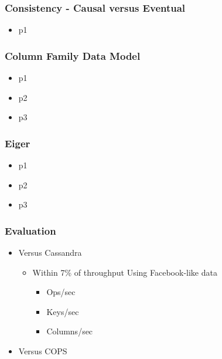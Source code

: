 \documentclass{beamer}
\begin{document}
\begin{frame}
\frametitle{Consistency - Causal versus Eventual}
\begin{itemize}
\pause \item p1	
\end{itemize}  
\end{frame}

\begin{frame}
\frametitle{Column Family Data Model}
\begin{itemize}
\pause \item p1 %
\pause \item p2
\pause \item p3
\end{itemize}  
\end{frame}



\begin{frame}
\frametitle{Eiger}
\begin{itemize}
\pause \item p1 %
\pause \item p2
\pause \item p3
\end{itemize}  
\end{frame}

\begin{frame}
\frametitle{Evaluation}
\begin{itemize}
\pause \item Versus Cassandra
		\begin{itemize}
			\item Within 7\% of throughput Using Facebook-like data
			\begin{itemize}
				\item Ops/sec
				\item Keys/sec
				\item Columns/sec
			\end{itemize}
		\end{itemize}
\pause \item Versus COPS
\end{itemize}  
\end{frame}
\end{document}
